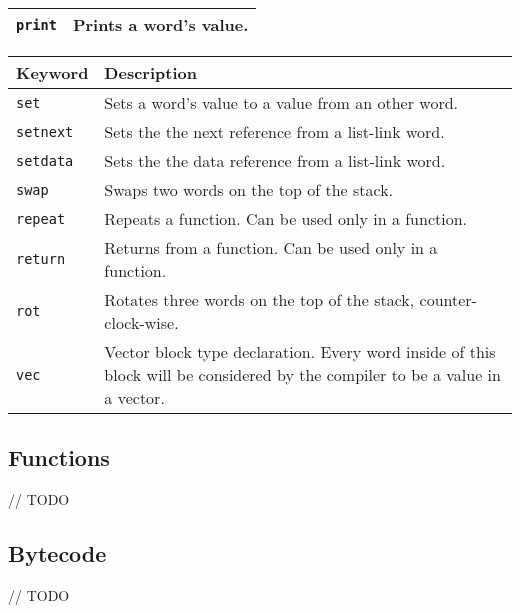 \documentclass[12pt]{article}
\begin{document}
\begin{center}
\begin{tabular}{ | l | p{9cm} | }
\verb|print| & Prints a word's value. \\ \hline

\end{tabular}

\begin{tabular}{ | l | p{9cm} | }
\hline
\textbf{Keyword} & \textbf{Description} \\ \hline

\verb|set| & Sets a word's value to a value from an other word. \\ \hline
\verb|setnext| & Sets the the next reference from a list-link word.  \\ \hline
\verb|setdata| & Sets the the data reference from a list-link word. \\ \hline
\verb|swap| & Swaps two words on the top of the stack. \\ \hline

\verb|repeat| & Repeats a function. Can be used only in a function. \\ \hline
\verb|return| & Returns from a function. Can be used only in a function. \\ \hline
\verb|rot| & Rotates three words on the top of the stack, counter-clock-wise.  \\ \hline

\verb|vec| & Vector block type declaration. Every word inside of this block will be considered by the compiler to be a value in a vector. \\ \hline
\end{tabular}
\end{center}

\subsection {Functions}

// TODO

\subsection {Bytecode}

// TODO
\end{document}
